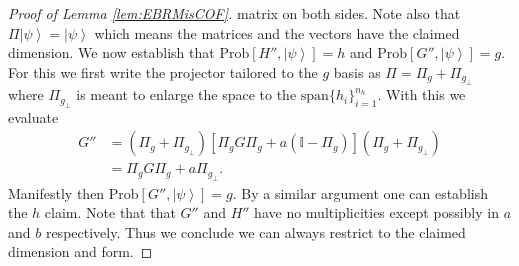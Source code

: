 \documentclass{article}
\begin{document}
\begin{proof}[Proof of Lemma \ref{lem:EBRMisCOF}]
matrix on both sides. Note also that $\Pi\left|\psi\right\rangle =\left|\psi\right\rangle $
which means the matrices and the vectors have the claimed dimension.
We now establish that $\text{Prob}[H'',\left|\psi\right\rangle ]=h$
and $\text{Prob}[G'',\left|\psi\right\rangle ]=g$. For this we first
write the projector tailored to the $g$ basis as $\Pi=\Pi_{g}+\Pi_{g_{\perp}}$
where $\Pi_{g_{\perp}}$ is meant to enlarge the space to the $\text{span}\{h_{i}\}_{i=1}^{n_{h}}$.
With this we evaluate 
\begin{align*}
G'' & =\left(\Pi_{g}+\Pi_{g_{\perp}}\right)\left[\Pi_{g}G\Pi_{g}+a(\mathbb{I}-\Pi_{g})\right]\left(\Pi_{g}+\Pi_{g_{\perp}}\right)\\
 & =\Pi_{g}G\Pi_{g}+a\Pi_{g_{\perp}}.
\end{align*}
Manifestly then $\text{Prob}[G'',\left|\psi\right\rangle ]=g$. By
a similar argument one can establish the $h$ claim. Note that that
$G''$ and $H''$ have no multiplicities except possibly in $a$ and
$b$ respectively. Thus we conclude we can always restrict to the
claimed dimension and form.
\end{proof}

%

%

%
%
%
%
%
%
%
%
%
%
%
%
%
%
%
%
%
%
%
%


%

%
%
%
%
%

%
%
%
%
%
%
%
%
%
%
%
%
%
%
%
%
%
	
%
%
%
%
%
%
%

%
%
%
%
%
%
%
%
%
%
%
%
%
%
%
%
%
%

%
%
%



%

%
	
%
%
%
	 
%
%
%
%
%
%
%
%
%
%
%
%
%
%
%
	
%
%
%
%

%

%
%
%
%
%
%
%
%
%
%
%
%
%
%
%
%
%
%
%
%
%
%
%
%
%
%
%
%
%
%
%
%
%
%
%

%
%
%
%

%
%
%
%
%
%
%
%
%
%
%
%
%
%
%
%
%
%
%
%
%
%
%
%
%
%
%
%
%
%
%
%
%
%
%
%
%
%
%
%
%
%
%





%
%
%
%
%
%
%
%
%
%
%
%
%
	
	
%
%
%
%
%
%
%
\end{document}
